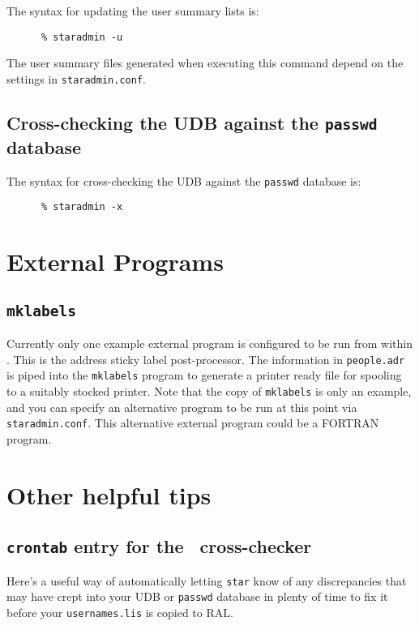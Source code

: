 The syntax for updating the user summary lists is:

\begin{verbatim}
      % staradmin -u
\end{verbatim}

The user summary files generated when executing this command depend on the
settings in {\tt staradmin.conf}.

\subsection{Cross-checking the UDB against the {\tt passwd} database}

The syntax for cross-checking the UDB against the {\tt passwd} database is:

\begin{verbatim}
      % staradmin -x
\end{verbatim}

\section{External Programs}

\subsection{{\tt mklabels}}

Currently only one example external program is configured to be run from
within \staradmin. This is the address sticky label post-processor. The
information in {\tt people.adr} is piped into the {\tt mklabels} program
to generate a printer ready file for spooling to a suitably stocked
printer. Note that the copy of {\tt mklabels} is only an example, and you
can specify an alternative program to be run at this point via {\tt
staradmin.conf}. This alternative external program could be a {\sf
FORTRAN} program. 


\section{Other helpful tips}

\subsection{{\tt crontab} entry for the \staradmin\ cross-checker}

Here's a useful way of automatically letting {\tt star} know of any
discrepancies that may have crept into your UDB or {\tt passwd} database
in plenty of time to fix it before your {\tt usernames.lis} is copied to
RAL. 

